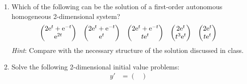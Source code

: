 \documentclass[../psets.tex]{subfiles}
\begin{document}
\begin{enumerate}
    \item Which of the following can be the solution of a first-order autonomous homogeneous 2-dimensional system?
    \begin{align*}
        \begin{pmatrix}
            2\e[t]+\e[-t]\\
            \e[2t]\\
        \end{pmatrix}&&
        \begin{pmatrix}
            2\e[t]+\e[-t]\\
            \e[t]\\
        \end{pmatrix}&&
        \begin{pmatrix}
            2\e[t]+\e[-t]\\
            t\e[t]\\
        \end{pmatrix}&&
        \begin{pmatrix}
            2\e[t]\\
            t^3\e[t]\\
        \end{pmatrix}&&
        \begin{pmatrix}
            2\e[t]\\
            t\e[t]\\
        \end{pmatrix}
    \end{align*}
    \emph{Hint}: Compare with the necessary structure of the solution discussed in class.
    \item Solve the following 2-dimensional initial value problems:
    \begin{align*}
        y' &=
        \begin{pmatrix}

\end{pmatrix}
\end{align*}
\end{enumerate}
\end{document}
